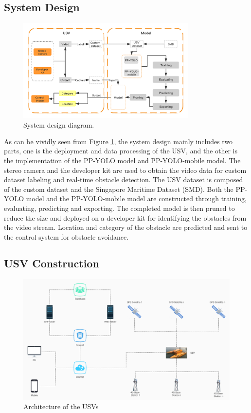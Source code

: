 \documentclass[sensors,article,submit,moreauthors,pdftex]{Definitions/mdpi}
\begin{document}
\begin{paracol}{2}
\section{System Design}

\begin{figure}[htbp]
\centering
\includegraphics[width=0.8\textwidth]{images/design.png}
\caption{System design diagram.}
\label{fig:system architecture}
\end{figure}

As can be vividly seen from Figure \ref{fig:system architecture}, the system design mainly includes two parts, one is the deployment and data processing of the USV, and the other is the implementation of the PP-YOLO model and  PP-YOLO-mobile model. The stereo camera and the developer kit are used to obtain the video data for custom dataset labeling and real-time obstacle detection. The USV dataset is composed of the custom dataset and the Singapore Maritime Dataset (SMD). Both the PP-YOLO model and the PP-YOLO-mobile model are constructed through training, evaluating, predicting and exporting. The completed model is then pruned to reduce the size and deployed on a developer kit for identifying the obstacles from the video stream. Location and category of the obstacle are predicted and sent to the control system for obstacle avoidance.


\subsection{USV Construction}
\begin{figure}[htbp]
\centering
\includegraphics[width=1\columnwidth]{images/USV-architecture.jpg}
\caption{Architecture of the USVs}
\label{fig:Architecture of USVs}
\end{figure}


\end{paracol}
\end{document}
